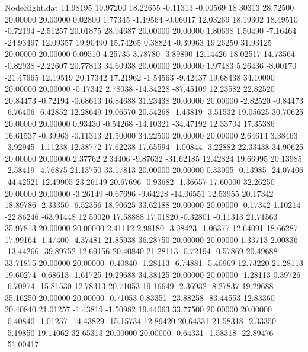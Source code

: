 \begin{filecontents}{NodeRight.dat}
  11.98195   19.97200   18.22655    -0.11313   -0.00569   18.30313   28.72500   20.00000   20.00000    0.02800    1.77345   -1.19564   -0.06017
  12.03269   18.19302   18.49510    -0.72194   -2.51257   20.01875   28.94687   20.00000   20.00000    1.80698    1.50490   -7.16464  -24.93497
  12.09357   19.90490   15.74265     0.38824   -0.39963   19.26250   31.93125   20.00000   20.00000    0.09510    4.25735    3.78780   -3.89890
  12.14426   18.02517   14.73564    -0.82938   -2.22607   20.77813   34.60938   20.00000   20.00000    1.97483    5.26436   -8.00170  -21.47665
  12.19519   20.17342   17.21962    -1.54563   -9.42437   19.68438   34.10000   20.00000   20.00000   -0.17342    2.78038  -14.34228  -87.45109
  12.23582   22.82520   20.84473    -0.72194   -0.68613   16.84688   31.23438   20.00000   20.00000   -2.82520   -0.84473   -6.76406   -6.42852
  12.28649   19.06570   20.54268    -1.43819   -3.51532   19.05625   30.70625   20.00000   20.00000    0.93430   -0.54268  -14.10321  -34.47192
  12.33704   17.35386   16.61537    -0.39963   -0.11313   21.50000   34.22500   20.00000   20.00000    2.64614    3.38463   -3.92945   -1.11238
  12.38772   17.62238   17.65594    -1.00844   -3.22882   22.33438   34.90625   20.00000   20.00000    2.37762    2.34406   -9.87632  -31.62185
  12.42824   19.66995   20.13985    -2.58419   -4.76875   21.13750   33.17813   20.00000   20.00000    0.33005   -0.13985  -24.07406  -44.42521
  12.49905   23.26149   20.67696    -0.93682   -1.36657   17.60000   32.26250   20.00000   20.00000   -3.26149   -0.67696   -9.64228  -14.06551
  12.53955   20.17342   18.89786    -2.33350   -6.52356   18.90625   33.62188   20.00000   20.00000   -0.17342    1.10214  -22.86246  -63.91448
  12.59020   17.58888   17.01820    -0.32801   -0.11313   21.71563   35.97813   20.00000   20.00000    2.41112    2.98180   -3.08423   -1.06377
  12.64091   18.66287   17.99164    -1.47400   -4.37481   21.85938   36.28750   20.00000   20.00000    1.33713    2.00836  -13.44266  -39.89752
  12.69156   20.40840   21.28113    -0.72194   -0.57869   20.49688   33.71875   20.00000   20.00000   -0.40840   -1.28113   -6.74881   -5.40969
  12.73220   21.28113   19.60274    -0.68613   -1.61725   19.29688   34.38125   20.00000   20.00000   -1.28113    0.39726   -6.70974  -15.81530
  12.78313   20.71053   19.16649    -2.36932   -8.27837   19.29688   35.16250   20.00000   20.00000   -0.71053    0.83351  -23.88258  -83.44553
  12.83360   20.40840   21.01257    -1.43819   -1.50982   19.44063   33.77500   20.00000   20.00000   -0.40840   -1.01257  -14.43829  -15.15734
  12.89420   20.64331   21.58318    -2.33350   -5.19850   19.14062   32.65313   20.00000   20.00000   -0.64331   -1.58318  -22.89476  -51.00417

\end{filecontents}
